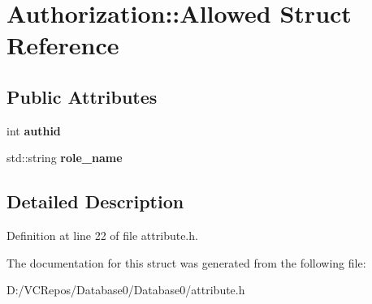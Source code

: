 \hypertarget{struct_authorization_1_1_allowed}{}\section{Authorization\+::Allowed Struct Reference}
\label{struct_authorization_1_1_allowed}
\subsection*{Public Attributes}
\begin{DoxyCompactItemize}
\item 
\mbox{\label{struct_authorization_1_1_allowed_aff9e93ee83888736893010f9696ca820}} 
int {\bfseries authid}
\item 
\mbox{\label{struct_authorization_1_1_allowed_a0395b98fcf1b700cc00a0c4359efd651}} 
std\+::string {\bfseries role\+\_\+name}
\end{DoxyCompactItemize}


\subsection{Detailed Description}


Definition at line 22 of file attribute.\+h.



The documentation for this struct was generated from the following file\+:\begin{DoxyCompactItemize}
\item 
D\+:/\+V\+C\+Repos/\+Database0/\+Database0/attribute.\+h\end{DoxyCompactItemize}
